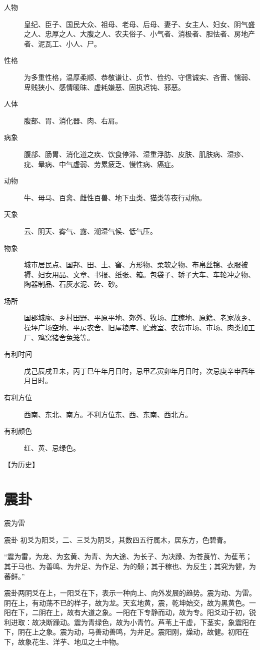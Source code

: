 \documentclass[12pt,oneside]{book}
\begin{document}
\begin{description}
\item[人物] 皇纪、臣子、国民大众、祖母、老母、后母、妻子、女主人、妇女、阴气盛之人、忠厚之人、大腹之人、农夫俗子、小气者、消极者、胆怯者、房地产者、泥瓦工、小人、尸。
\item[性格] 为多重性格，温厚柔顺、恭敬谦让、贞节、俭约、守信诚实、吝啬、懦弱、卑贱狭小、感情暖昧、虚耗嫌恶、固执迟钝、邪恶。
\item[人体] 腹部、胃、消化器、肉、右肩。
\item[病象] 腹部、肠胃、消化道之疾、饮食停滞、湿重浮肪、皮肤、肌肤病、湿疹、疣、晕病、中气虚弱、劳累疲乏、慢性病、癌症。
\item[动物] 牛、母马、百禽、雌性百兽、地下虫类、猫类等夜行动物。
\item[天象] 云、阴天、雾气、露、潮湿气候、低气压。
\item[物象] 城市居民点、国邦、田、土、窖、方形物、柔软之物、布帛丝锦、衣服被褥、妇女用品、文章、书报、纸张、箱。包袋子、轿子大车、车轮冲之物、陶器制品、石灰水泥、砖、砂。
\item[场所] 国郡城廓、乡村田野、平原平地、郊外、牧场、庄稼地、原籍、老家故乡、操坪广场空地、平房农舍、旧屋粮库、贮藏室、农贸市场、市场、肉类加工厂、鸡窝猪舍兔笼等。
\item[有利时间] 戊己辰戌丑未，丙丁巳午年月日时，忌甲乙寅卯年月日时，次忌庚辛申酉年月日时。
\item[有利方位] 西南、东北、南方。不利方位东、西、东南、西北方。
\item[有利颜色] 红、黄、忌绿色。
\end{description}


【为历史】


\section{震卦}
震为雷

震卦 初爻为阳爻，二、三爻为阴爻，其数四五行属木，居东方，色碧青。

“震为雷，为龙、为玄黄、为青、为大途、为长子、为决躁、为苍莨竹、为萑苇；其于马也、为善鸣、为弁足、为作足、为的颡；其于稼也、为反生；其究为健，为蕃鲜。”

震卦两阴爻在上，一阳爻在下，表示一种向上、向外发展的趋势。震为动、为雷。阴在上，有动荡不已的样子，故为龙。天玄地黄，震，乾坤始交，故为黑黄色。一阳在下，二阴在上，故有大道之象。一阳在下专静而动，故为专。阳爻动于初，锐利进取：故决断躁动。震为青绿色，故为小青竹。芦苇上干虚，下茎实，象震阳在下，阴在上之象。震为动，马善动善鸣，为弁足。震阳刚，燥动，故健。初阳在下，故象花生、洋芋、地瓜之土中物。
\end{document}
